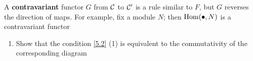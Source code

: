 \documentclass[11pt]{article}
\begin{document}
A \textbf{contravariant} functor \(G\) from \(\mathcal{C}\) to \(\mathcal{C}'\) is a rule similar
to \(F\), but \(G\) reverses the direction of maps. For example, fix a module
\(N\); then \(\operatorname{Hom}(\bullet,N)\) is a contravariant functor

\begin{exercise}
\label{6.3}
\begin{enumerate}
\item Show that the condition \ref{5.2} (1) is equivalent to the commutativity of
the corresponding diagram
\begin{center}
\end{center}
\end{enumerate}
\end{exercise}
\end{document}
